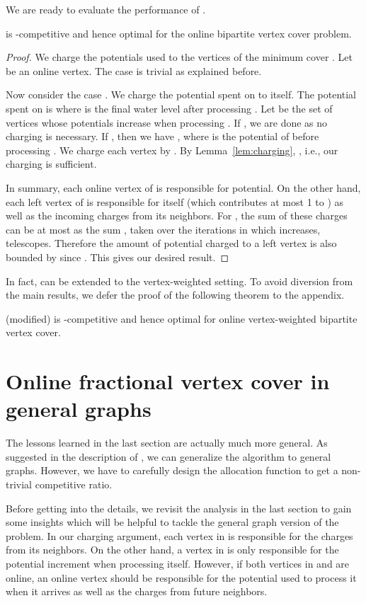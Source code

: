\documentclass{article}
\begin{document}
We are ready to evaluate the performance of . 
\begin{theorem}
\label{thm:no alternation}
 is -competitive and hence optimal for the online bipartite vertex cover problem.
\end{theorem}
\begin{proof}
We charge the potentials used to the vertices of the minimum cover . Let  be an online vertex. The case  is trivial as explained before.



Now consider the case . We charge the potential spent on  to  itself. The potential spent on  is  where  is the final water level after processing . 
Let  be the set of vertices whose potentials increase when processing .
If , we are done as no charging is necessary. If , then we have , where  is the potential of  before processing . We charge each vertex  by . By Lemma~\ref{lem:charging}, , i.e., our charging is sufficient.



In summary, each online vertex of  is responsible for  potential. On the other hand, each left vertex of  is responsible for itself (which contributes at most 1 to ) as well as the incoming charges from its neighbors. For , the sum of these charges can be at most  as the sum , taken over the iterations in which  increases, telescopes. Therefore the amount of potential charged to a left vertex is also bounded by  since .
This gives our desired result.
\end{proof}

In fact,  can be extended to the vertex-weighted setting. To avoid diversion from the main results, we defer the proof of the following theorem to the appendix.
\begin{theorem}
 (modified) is -competitive and hence optimal for online vertex-weighted bipartite vertex cover.
\end{theorem}


\section{Online fractional vertex cover in general graphs}
The lessons learned in the last section are actually much more general. As suggested in the description of , we can generalize the algorithm to general graphs. However, we have to carefully design the allocation function  to get a non-trivial competitive ratio.

Before getting into the details, we revisit the analysis in the last section to gain some insights which will be helpful to tackle the general graph version of the problem. In our charging argument, each vertex in  is responsible for the charges from its neighbors. On the other hand, a vertex in  is only responsible for the potential increment when processing itself. However, if both vertices in  and  are online, an online vertex  should be responsible for the potential used to process it when it arrives as well as the charges from future neighbors.
\end{document}
